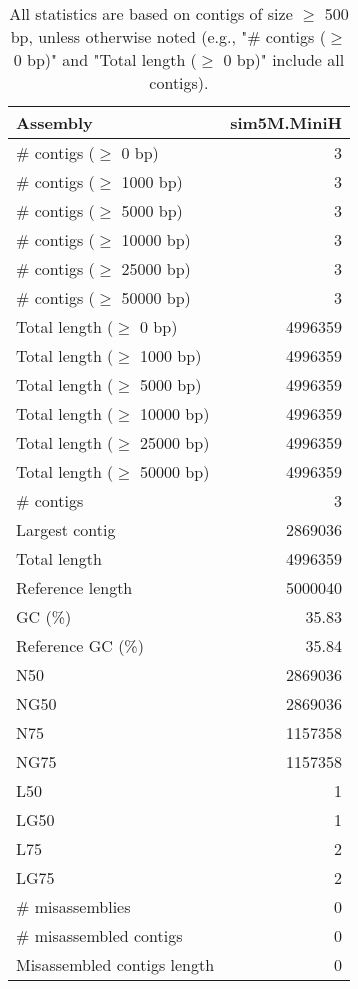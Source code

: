 \documentclass[12pt,a4paper]{article}
\begin{document}
\begin{table}[ht]
\begin{center}
\caption{All statistics are based on contigs of size $\geq$ 500 bp, unless otherwise noted (e.g., "\# contigs ($\geq$ 0 bp)" and "Total length ($\geq$ 0 bp)" include all contigs).}
\begin{tabular}{|l*{1}{|r}|}
\hline
Assembly & sim5M.MiniH \\ \hline
\# contigs ($\geq$ 0 bp) & 3 \\ \hline
\# contigs ($\geq$ 1000 bp) & 3 \\ \hline
\# contigs ($\geq$ 5000 bp) & 3 \\ \hline
\# contigs ($\geq$ 10000 bp) & 3 \\ \hline
\# contigs ($\geq$ 25000 bp) & 3 \\ \hline
\# contigs ($\geq$ 50000 bp) & 3 \\ \hline
Total length ($\geq$ 0 bp) & 4996359 \\ \hline
Total length ($\geq$ 1000 bp) & 4996359 \\ \hline
Total length ($\geq$ 5000 bp) & 4996359 \\ \hline
Total length ($\geq$ 10000 bp) & 4996359 \\ \hline
Total length ($\geq$ 25000 bp) & 4996359 \\ \hline
Total length ($\geq$ 50000 bp) & 4996359 \\ \hline
\# contigs & 3 \\ \hline
Largest contig & 2869036 \\ \hline
Total length & 4996359 \\ \hline
Reference length & 5000040 \\ \hline
GC (\%) & 35.83 \\ \hline
Reference GC (\%) & 35.84 \\ \hline
N50 & 2869036 \\ \hline
NG50 & 2869036 \\ \hline
N75 & 1157358 \\ \hline
NG75 & 1157358 \\ \hline
L50 & 1 \\ \hline
LG50 & 1 \\ \hline
L75 & 2 \\ \hline
LG75 & 2 \\ \hline
\# misassemblies & 0 \\ \hline
\# misassembled contigs & 0 \\ \hline
Misassembled contigs length & 0 \\ \hline

\end{tabular}
\end{center}
\end{table}
\end{document}
